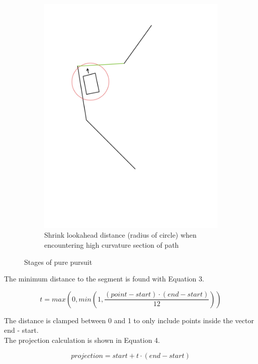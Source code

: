 \documentclass{article}
\begin{document}
\begin{figure}[h]
\begin{subfigure}[b]{0.25\textwidth}
        \includegraphics[width=\textwidth]{6.141-54.jpg}
        \caption{Shrink lookahead distance (radius of circle) when encountering high curvature section of path}
    \end{subfigure}
        \caption{Stages of pure pursuit}
        \label{fig:Corner Traversal Figures}
\end{figure}

The minimum distance to the segment is found with Equation 3.

\begin{equation}
    t = max\left(0, min\left( 1, \frac{(point - start) \cdot (end - start)}{12} \right)\right)
\end{equation}

The distance is clamped between 0 and 1 to only include points inside the vector end - start.\\

The projection calculation is shown in Equation 4.

\begin{equation}
    projection = start + t \cdot (end - start)
\end{equation}
\end{document}
